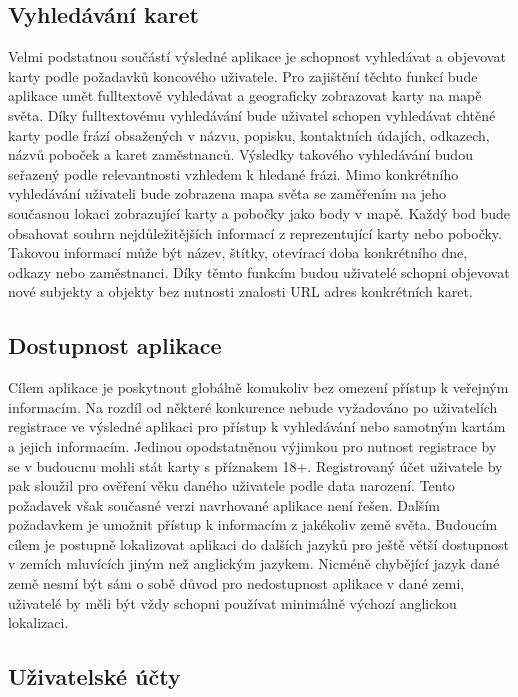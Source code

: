 \begin{itemize}
\begin{itemize}
	\subsection{Vyhledávání karet}

	Velmi podstatnou součástí výsledné aplikace je schopnost vyhledávat a objevovat karty podle požadavků koncového uživatele.
	Pro zajištění těchto funkcí bude aplikace umět fulltextově vyhledávat a geograficky zobrazovat karty na mapě světa.
	Díky fulltextovému vyhledávání bude uživatel schopen vyhledávat chtěné karty podle frází obsažených v názvu,
	popisku, kontaktních údajích, odkazech, názvů poboček a karet zaměstnanců.
	Výsledky takového vyhledávání budou seřazený podle relevantnosti vzhledem k hledané frázi.
	Mimo konkrétního vyhledávání uživateli bude zobrazena mapa světa se zaměřením na jeho současnou lokaci zobrazující
	karty a pobočky jako body v mapě.
	Každý bod bude obsahovat souhrn nejdůležitějších informací z reprezentující karty nebo pobočky.
	Takovou informací může být název, štítky, otevírací doba konkrétního dne, odkazy nebo zaměstnanci.
	Díky těmto funkcím budou uživatelé schopni objevovat nové subjekty a objekty bez nutnosti znalosti \ac{URL} adres
	konkrétních karet.

	\subsection{Dostupnost aplikace}

	Cílem aplikace je poskytnout globálně komukoliv bez omezení přístup k veřejným informacím.
	Na rozdíl od některé konkurence nebude vyžadováno po uživatelích registrace ve výsledné aplikaci pro přístup k vyhledávání
	nebo samotným kartám a jejich informacím.
	Jedinou opodstatněnou výjimkou pro nutnost registrace by se v budoucnu mohli stát karty s příznakem 18+.
	Registrovaný účet uživatele by pak sloužil pro ověření věku daného uživatele podle data narození.
	Tento požadavek však současné verzi navrhované aplikace není řešen.
	Dalším požadavkem je umožnit přístup k informacím z jakékoliv země světa.
	Budoucím cílem je postupně lokalizovat aplikaci do dalších jazyků pro ještě větší dostupnost v zemích mluvících
	jiným než anglickým jazykem.
	Nicméně chybějící jazyk dané země nesmí být sám o sobě důvod pro nedostupnost aplikace v dané zemi, uživatelé by
	měli být vždy schopni používat minimálně výchozí anglickou lokalizaci.

	\subsection{Uživatelské účty}


\end{itemize}
\end{itemize}
